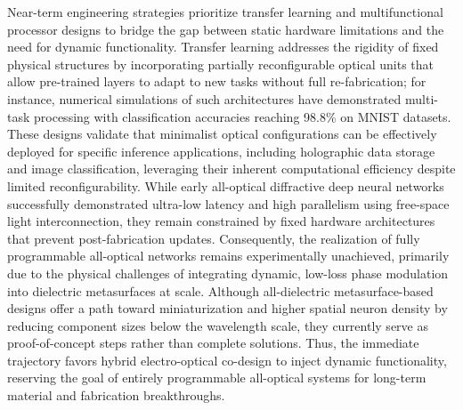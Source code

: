Near-term engineering strategies prioritize transfer learning and multifunctional processor designs to bridge the gap between static hardware limitations and the need for dynamic functionality. Transfer learning addresses the rigidity of fixed physical structures by incorporating partially reconfigurable optical units that allow pre-trained layers to adapt to new tasks without full re-fabrication; for instance, numerical simulations of such architectures have demonstrated multi-task processing with classification accuracies reaching 98.8\% on MNIST datasets. These designs validate that minimalist optical configurations can be effectively deployed for specific inference applications, including holographic data storage and image classification, leveraging their inherent computational efficiency despite limited reconfigurability. While early all-optical diffractive deep neural networks successfully demonstrated ultra-low latency and high parallelism using free-space light interconnection, they remain constrained by fixed hardware architectures that prevent post-fabrication updates. Consequently, the realization of fully programmable all-optical networks remains experimentally unachieved, primarily due to the physical challenges of integrating dynamic, low-loss phase modulation into dielectric metasurfaces at scale. Although all-dielectric metasurface-based designs offer a path toward miniaturization and higher spatial neuron density by reducing component sizes below the wavelength scale, they currently serve as proof-of-concept steps rather than complete solutions. Thus, the immediate trajectory favors hybrid electro-optical co-design to inject dynamic functionality, reserving the goal of entirely programmable all-optical systems for long-term material and fabrication breakthroughs. \citep{doi_10_1117_12_3109287_f4650a31} \citep{doi_10_3390_photonics11020145_68f5de58} \citep{doi_10_1364_josab_497148_b087424b} \citep{doi_10_1117_12_2688132_926a2697}

